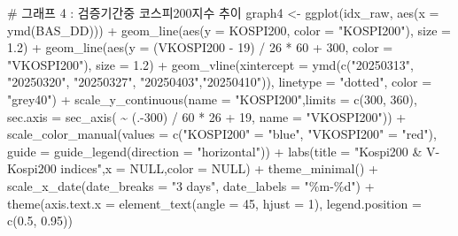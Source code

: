 \documentclass[
  a4paper,
  DIV=11,
  numbers=noendperiod]{scrreprt}
\newenvironment{Shaded}{\begin{snugshade}}{\end{snugshade}}
\newcommand{\AttributeTok}[1]{\textcolor[rgb]{0.40,0.45,0.13}{#1}}
\newcommand{\CommentTok}[1]{\textcolor[rgb]{0.37,0.37,0.37}{#1}}
\newcommand{\ConstantTok}[1]{\textcolor[rgb]{0.56,0.35,0.01}{#1}}
\newcommand{\DecValTok}[1]{\textcolor[rgb]{0.68,0.00,0.00}{#1}}
\newcommand{\FloatTok}[1]{\textcolor[rgb]{0.68,0.00,0.00}{#1}}
\newcommand{\FunctionTok}[1]{\textcolor[rgb]{0.28,0.35,0.67}{#1}}
\newcommand{\NormalTok}[1]{\textcolor[rgb]{0.00,0.23,0.31}{#1}}
\newcommand{\OtherTok}[1]{\textcolor[rgb]{0.00,0.23,0.31}{#1}}
\newcommand{\SpecialCharTok}[1]{\textcolor[rgb]{0.37,0.37,0.37}{#1}}
\newcommand{\StringTok}[1]{\textcolor[rgb]{0.13,0.47,0.30}{#1}}
\begin{document}
\begin{Shaded}
\begin{Highlighting}[]
\CommentTok{\# 그래프 4 : 검증기간중 코스피200지수 추이}
\NormalTok{graph4 }\OtherTok{\textless{}{-}} \FunctionTok{ggplot}\NormalTok{(idx\_raw, }\FunctionTok{aes}\NormalTok{(}\AttributeTok{x =} \FunctionTok{ymd}\NormalTok{(BAS\_DD))) }\SpecialCharTok{+}
  \FunctionTok{geom\_line}\NormalTok{(}\FunctionTok{aes}\NormalTok{(}\AttributeTok{y =}\NormalTok{ KOSPI200, }\AttributeTok{color =} \StringTok{"KOSPI200"}\NormalTok{), }\AttributeTok{size =} \FloatTok{1.2}\NormalTok{) }\SpecialCharTok{+}
  \FunctionTok{geom\_line}\NormalTok{(}\FunctionTok{aes}\NormalTok{(}\AttributeTok{y =}\NormalTok{ (VKOSPI200 }\SpecialCharTok{{-}} \DecValTok{19}\NormalTok{) }\SpecialCharTok{/} \DecValTok{26} \SpecialCharTok{*} \DecValTok{60} \SpecialCharTok{+} \DecValTok{300}\NormalTok{, }\AttributeTok{color =} \StringTok{"VKOSPI200"}\NormalTok{), }\AttributeTok{size =} \FloatTok{1.2}\NormalTok{) }\SpecialCharTok{+}
  \FunctionTok{geom\_vline}\NormalTok{(}\AttributeTok{xintercept =} \FunctionTok{ymd}\NormalTok{(}\FunctionTok{c}\NormalTok{(}\StringTok{"20250313"}\NormalTok{, }\StringTok{"20250320"}\NormalTok{, }\StringTok{"20250327"}\NormalTok{, }\StringTok{"20250403"}\NormalTok{,}\StringTok{"20250410"}\NormalTok{)),}
             \AttributeTok{linetype =} \StringTok{"dotted"}\NormalTok{, }\AttributeTok{color =} \StringTok{"grey40"}\NormalTok{) }\SpecialCharTok{+}
  \FunctionTok{scale\_y\_continuous}\NormalTok{(}\AttributeTok{name =} \StringTok{"KOSPI200"}\NormalTok{,}\AttributeTok{limits =} \FunctionTok{c}\NormalTok{(}\DecValTok{300}\NormalTok{, }\DecValTok{360}\NormalTok{),}
                     \AttributeTok{sec.axis =} \FunctionTok{sec\_axis}\NormalTok{(}
                       \SpecialCharTok{\textasciitilde{}}\NormalTok{ (.}\SpecialCharTok{{-}}\DecValTok{300}\NormalTok{) }\SpecialCharTok{/} \DecValTok{60} \SpecialCharTok{*} \DecValTok{26} \SpecialCharTok{+} \DecValTok{19}\NormalTok{, }\AttributeTok{name =} \StringTok{"VKOSPI200"}\NormalTok{)) }\SpecialCharTok{+}
  \FunctionTok{scale\_color\_manual}\NormalTok{(}\AttributeTok{values =} \FunctionTok{c}\NormalTok{(}\StringTok{"KOSPI200"} \OtherTok{=} \StringTok{"blue"}\NormalTok{, }\StringTok{"VKOSPI200"} \OtherTok{=} \StringTok{"red"}\NormalTok{),}
                     \AttributeTok{guide =} \FunctionTok{guide\_legend}\NormalTok{(}\AttributeTok{direction =} \StringTok{"horizontal"}\NormalTok{)) }\SpecialCharTok{+}
  \FunctionTok{labs}\NormalTok{(}\AttributeTok{title =} \StringTok{"Kospi200 \& V{-}Kospi200 indices"}\NormalTok{,}\AttributeTok{x =} \ConstantTok{NULL}\NormalTok{,}\AttributeTok{color =} \ConstantTok{NULL}\NormalTok{) }\SpecialCharTok{+}
  \FunctionTok{theme\_minimal}\NormalTok{() }\SpecialCharTok{+}
  \FunctionTok{scale\_x\_date}\NormalTok{(}\AttributeTok{date\_breaks =} \StringTok{"3 days"}\NormalTok{, }\AttributeTok{date\_labels =} \StringTok{"\%m{-}\%d"}\NormalTok{) }\SpecialCharTok{+}
  \FunctionTok{theme}\NormalTok{(}\AttributeTok{axis.text.x =} \FunctionTok{element\_text}\NormalTok{(}\AttributeTok{angle =} \DecValTok{45}\NormalTok{, }\AttributeTok{hjust =} \DecValTok{1}\NormalTok{),}
        \AttributeTok{legend.position =} \FunctionTok{c}\NormalTok{(}\FloatTok{0.5}\NormalTok{, }\FloatTok{0.95}\NormalTok{))}
\end{Highlighting}
\end{Shaded}
\end{document}
